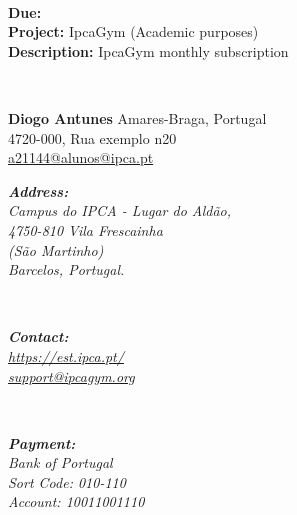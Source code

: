 \documentclass[
        a4paper,
        9pt,
]{/home/db/dev/repo_g06/Invoice/invoice}
\begin{document}
\outputinvoicenum \\
\begin{minipage}[t]{0.38\textwidth}
        \textbf{Due:} \\
    \textbf{Project:} IpcaGym (Academic purposes)\\
        \textbf{Description:} IpcaGym monthly subscription\\
\end{minipage}
\begin{minipage}[t]{0.03\textwidth}
        ~
\end{minipage}
\begin{minipage}[t]{0.56\textwidth}
	\textbf{Diogo Antunes}
    Amares-Braga, Portugal\\
4720-000, Rua exemplo n20 \\
	\href{a21144@alunos@ipca.pt}{a21144@alunos@ipca.pt}
\end{minipage}
\vfill
\begin{invoicetable}
\end{invoicetable}
\vfill\vfill
{}
\begin{minipage}[t]{0.3\textwidth}
        \itshape
        \textbf{Address:}\\
    Campus do IPCA - Lugar do Aldão,\\
    4750-810 Vila Frescainha\\
    (São Martinho)\\
    Barcelos, Portugal.
\end{minipage}
\begin{minipage}[t]{0.03\textwidth}
        ~
\end{minipage}
\begin{minipage}[t]{0.3\textwidth}
        \itshape
        \textbf{Contact:}\\
        \href{https://est.ipca.pt/}{https://est.ipca.pt/}\\
    \href{support@ipcagym.org}{support@ipcagym.org} \\
\end{minipage}
\begin{minipage}[t]{0.03\textwidth}
        ~
\end{minipage}
\begin{minipage}[t]{0.3\textwidth}
        \itshape
        \textbf{Payment:}\\
        Bank of Portugal \\
        Sort Code: 010-110 \\
        Account: 10011001110 \\
\end{minipage}
\end{document}
